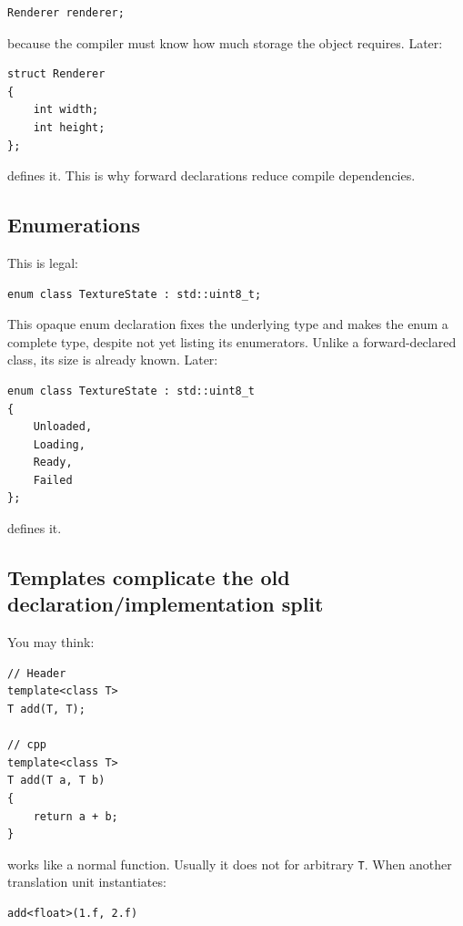 \begin{verbatim}
Renderer renderer;
\end{verbatim}

because the compiler must know how much storage the object requires. Later:

\begin{verbatim}
struct Renderer
{
    int width;
    int height;
};
\end{verbatim}

defines it. This is why forward declarations reduce compile dependencies.

\subsection{Enumerations}\label{05-engine-i-ch002-enumerations}

This is legal:

\begin{verbatim}
enum class TextureState : std::uint8_t;
\end{verbatim}

This opaque enum declaration fixes the underlying type and makes the enum a complete type, despite not yet listing its enumerators. Unlike a forward-declared class, its size is already known. Later:

\begin{verbatim}
enum class TextureState : std::uint8_t
{
    Unloaded,
    Loading,
    Ready,
    Failed
};
\end{verbatim}

defines it.

\subsection{Templates complicate the old declaration/implementation split}\label{05-engine-i-ch002-templates-complicate-the-old-declarationimplementation-split}

You may think:

\begin{verbatim}
// Header
template<class T>
T add(T, T);

// cpp
template<class T>
T add(T a, T b)
{
    return a + b;
}
\end{verbatim}

works like a normal function. Usually it does not for arbitrary \texttt{T}. When another translation unit instantiates:

\begin{verbatim}
add<float>(1.f, 2.f)
\end{verbatim}

